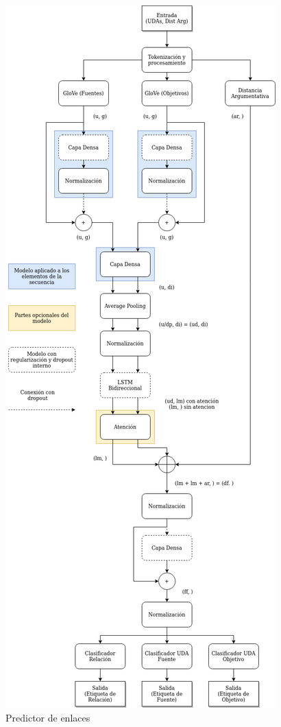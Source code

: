 \begin{figure}[h!]
	\begin{center}
		\begin{center}
			\includegraphics[scale=.3]{Graphics/Modelo_Link_Prediction.png}
        \end{center}
	    \caption{Predictor de enlaces}\label{fig:link_predictor}
	\end{center}
\end{figure}

